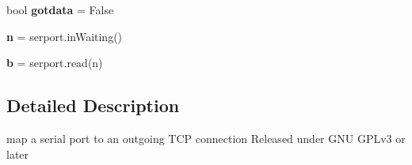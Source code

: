 \begin{DoxyCompactItemize}
\mbox{\label{namespacepymavlink_1_1tools_1_1sertotcp_aa9236c906f0fd9eba4a3ba194992ca22}} 
bool {\bfseries gotdata} = False
\item 
\mbox{\label{namespacepymavlink_1_1tools_1_1sertotcp_adef36cfc28a514a6fd90610647203385}} 
{\bfseries n} = serport.\+in\+Waiting()
\item 
\mbox{\label{namespacepymavlink_1_1tools_1_1sertotcp_a71a94e54f6490e74e277b00e3e8c9680}} 
{\bfseries b} = serport.\+read(n)
\end{DoxyCompactItemize}


\subsection{Detailed Description}
\begin{DoxyVerb}map a serial port to an outgoing TCP connection
Released under GNU GPLv3 or later
\end{DoxyVerb}
 